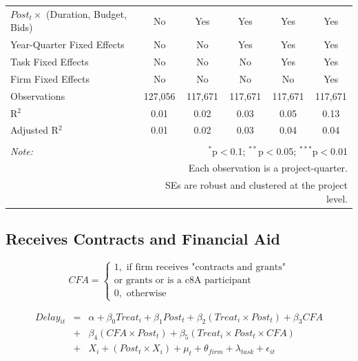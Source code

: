 \documentclass[
]{article}
\begin{document}
\begin{table}[H]
\begin{tabular}{@{\extracolsep{-2pt}}lccccc}
$Post_t \times $  (Duration, Budget, Bids) & No & Yes & Yes & Yes & Yes \\ 
Year-Quarter Fixed Effects & No & No & Yes & Yes & Yes \\ 
Task Fixed Effects & No & No & No & Yes & Yes \\ 
Firm Fixed Effects & No & No & No & No & Yes \\ 
Observations & 127,056 & 117,671 & 117,671 & 117,671 & 117,671 \\ 
R$^{2}$ & 0.01 & 0.02 & 0.03 & 0.05 & 0.13 \\ 
Adjusted R$^{2}$ & 0.01 & 0.02 & 0.03 & 0.04 & 0.04 \\ 
\hline 
\hline \\[-1.8ex] 
\textit{Note:}  & \multicolumn{5}{r}{$^{*}$p$<$0.1; $^{**}$p$<$0.05; $^{***}$p$<$0.01} \\ 
 & \multicolumn{5}{r}{Each observation is a project-quarter.} \\ 
 & \multicolumn{5}{r}{SEs are robust and clustered at the project level.} \\ 
\end{tabular} 
\end{table}

\hypertarget{receives-contracts-and-financial-aid}{%
\subsection{Receives Contracts and Financial
Aid}\label{receives-contracts-and-financial-aid}}

\[ CFA = \begin{cases} 1, \text{ if firm receives "contracts and grants"}\\ 
                       \text{or grants or is a c8A participant}\\
0, \text{ otherwise} \end{cases}\]

\[ \begin{aligned}
Delay_{it} &=& \alpha+\beta_0 Treat_i + \beta_1 Post_t + \beta_2 (Treat_i \times Post_t) +\beta_3 CFA \\
&+& \beta_4 (CFA \times Post_t) + \beta_5 (Treat_i \times Post_t \times CFA) \\ 
&+&X_i + (Post_t \times X_i) + \mu_t + \theta_{firm} + \lambda_{task}+ \epsilon_{it}
\end{aligned}\]
\end{document}
